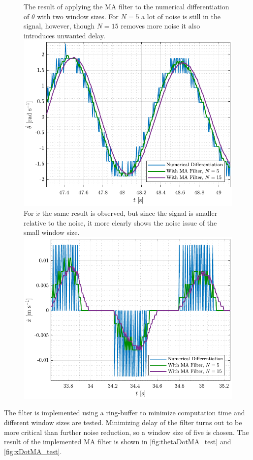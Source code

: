 \begin{figure}[H]
  \hspace{1cm}
  \captionbox
  {
    The result of applying the MA filter to the numerical differentiation of $\theta$ with two window sizes. For $N = 5$ a lot of noise is still in the signal, however, though $N=15$ removes more noise it also introduces unwanted delay. 
    \label{fig:thetaDotMA_design}
  }
  {
    \hspace{-1cm}
    \includegraphics[width=.45\textwidth]{figures/thetaDotMA_design}
  }
  \hspace{20pt}
  \captionbox 
  {
    For $\dot{x}$ the same result is observed, but since the signal is smaller relative to the noise, it more clearly shows the noise issue of the small window size.
    \label{fig:xDotMA_design}
  }
  {
    \hspace{-1cm}
    \includegraphics[width=.45\textwidth]{figures/xDotMA_design}
  }  
\end{figure}
%
The filter is implemented using a ring-buffer to minimize computation time and different window sizes are tested. Minimizing delay of the filter turns out to be more critical than further noise reduction, so a window size of five is chosen. The result of the implemented MA filter is shown in \autoref{fig:thetaDotMA_test} and \ref{fig:xDotMA_test}.
%
